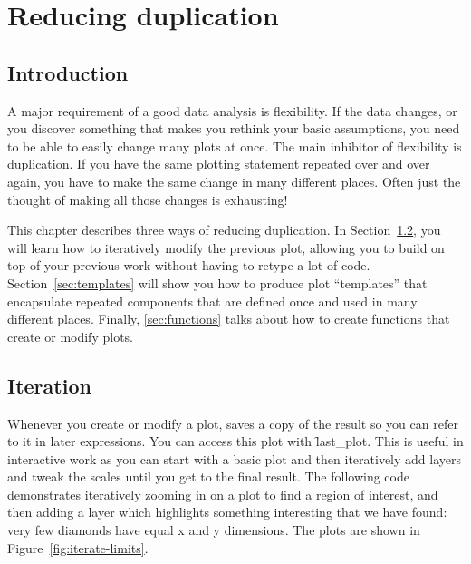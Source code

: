 

% 


\chapter{Reducing duplication}
\label{cha:duplication}

\section{Introduction}

A major requirement of a good data analysis is flexibility. If the data changes, or you discover something that makes you rethink your basic assumptions, you need to be able to easily change many plots at once. The main inhibitor of flexibility is duplication. If you have the same plotting statement repeated over and over again, you have to make the same change in many different places. Often just the thought of making all those changes is exhausting!

This chapter describes three ways of reducing duplication. In Section~\ref{sec:iteration}, you will learn how to iteratively modify the previous plot, allowing you to build on top of your previous work without having to retype a lot of code. Section~\ref{sec:templates} will show you how to produce plot ``templates'' that encapsulate repeated components that are defined once and used in many different places. Finally, \ref{sec:functions} talks about how to create functions that create or modify plots.   

\section{Iteration}
\label{sec:iteration}

Whenever you create or modify a plot, \ggplot saves a copy of the result so you can refer to it in later expressions. You can access this plot with \f{last_plot}. This is useful in interactive work as you can start with a basic plot and then iteratively add layers and tweak the scales until you get to the final result. The following code demonstrates iteratively zooming in on a plot to find a region of interest, and then adding a layer which highlights something interesting that we have found: very few diamonds have equal x and y dimensions. The plots are shown in Figure~\ref{fig:iterate-limits}.   

